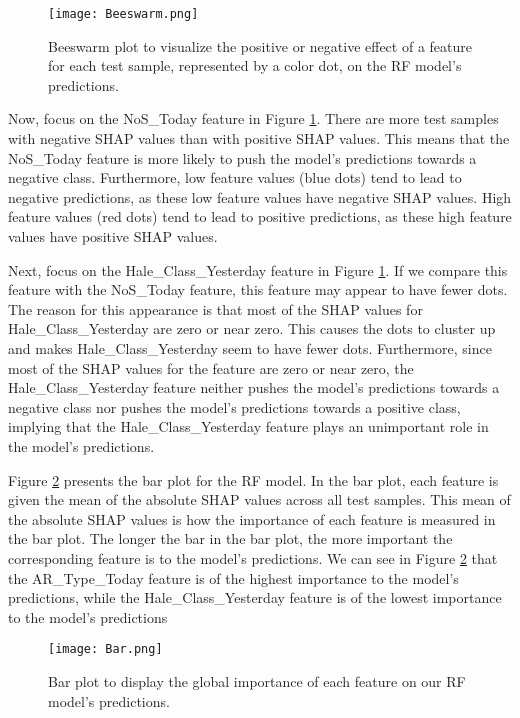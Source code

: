 \documentclass[draft]{agujournal2019}
\begin{document}
\begin{figure}
\centering
\hspace*{-0.7cm}
\texttt{[image: Beeswarm.png]}
\caption{Beeswarm plot to visualize the positive or negative
effect of a feature for each test sample, represented by a
color dot, on the RF model’s predictions.}
\label{fig:beeswarm1}
\end{figure}

Now, focus on the NoS\_Today feature in Figure \ref{fig:beeswarm1}. There are
more test samples with negative SHAP values than with positive
SHAP values. This means that the NoS\_Today feature is
more likely to push the model’s predictions towards a negative
class. Furthermore, low feature values (blue dots) tend
to lead to negative predictions, as these low feature values
have negative SHAP values. High feature values (red dots)
tend to lead to positive predictions, as these high feature values
have positive SHAP values.

Next, focus on the Hale\_Class\_Yesterday feature in 
Figure \ref{fig:beeswarm1}.
If we compare this feature with the 
NoS\_Today feature,
this feature may appear to have fewer dots. The reason
for this appearance is that most of the SHAP values for
Hale\_Class\_Yesterday are zero or near zero. 
This causes the dots to
cluster up and makes Hale\_Class\_Yesterday seem to have fewer dots.
Furthermore, since most of the SHAP values for the feature
are zero or near zero, the Hale\_Class\_Yesterday feature neither pushes
the model’s predictions towards a negative class nor pushes
the model’s predictions towards a positive class, implying
that the Hale\_Class\_Yesterday feature plays an unimportant role in the
model’s predictions.

Figure \ref{fig:barplot} presents the bar plot
for the RF model. In
the bar plot, each feature is given the mean of the absolute
SHAP values across all test samples. This mean of the absolute
SHAP values is how the importance of each feature
is measured in the bar plot. The longer the bar in the bar
plot, the more important the corresponding feature is to the
model’s predictions. We can see in Figure \ref{fig:barplot} that the AR\_Type\_Today
feature is of the highest importance to the model’s predictions,
while the Hale\_Class\_Yesterday feature is of the lowest importance to the model’s predictions

\begin{figure}
\centering
\hspace*{-0.7cm}
\texttt{[image: Bar.png]}
\caption{Bar plot to display the global importance of each
feature on our RF model’s predictions.}
\label{fig:barplot}
\end{figure}
\end{document}
